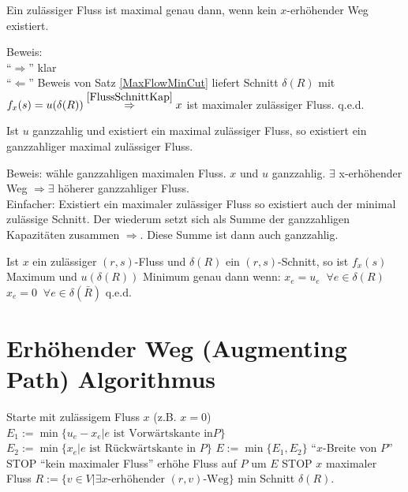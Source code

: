 \begin{satz}
Ein zulässiger Fluss ist maximal genau dann, wenn kein $x$-erhöhender Weg
existiert.
\end{satz}
Beweis: \\
"`$\Rightarrow$"' klar\\
"`$\Leftarrow$"' Beweis von Satz \ref{MaxFlowMinCut} liefert Schnitt
$\delta(R)$ mit $f_{x}(s) = u (\delta(R)) \stackrel{\ref{FlussSchnittKap}}{
\Rightarrow} x$ ist maximaler zulässiger Fluss. q.e.d.

\begin{satz}
Ist $u$ ganzzahlig und existiert ein maximal zulässiger Fluss, so existiert
ein ganzzahliger maximal zulässiger Fluss.
\end{satz}
Beweis: wähle ganzzahligen maximalen Fluss. $x$ und $u$ ganzzahlig.
$\exists$ x-erhöhender Weg $\Rightarrow \exists$ höherer ganzzahliger Fluss.\\
Einfacher: Existiert ein maximaler zulässiger Fluss so existiert auch der
minimal zulässige Schnitt. Der wiederum setzt sich als Summe der
ganzzahligen Kapazitäten zusammen $\Rightarrow$. Diese Summe ist dann auch 
ganzzahlig.

\begin{korollar}
Ist $x$ ein zulässiger $(r,s)$-Fluss und $\delta(R)$ ein
$(r,s)$-Schnitt, so ist $f_{x}(s)$ Maximum und $u(\delta(R))$ Minimum genau
dann wenn: 
$x_{e} = u_{e} \; \; \forall e \in \delta(R)$\\
$x_{e} = 0 \;\; \forall e \in \delta(\bar{R}) \mbox{ q.e.d.}$
\end{korollar}

\section{Erhöhender Weg (Augmenting Path) Algorithmus}

\begin{algorithmic}
\STATE Starte mit zulässigem Fluss $x$ (z.B. $x=0$)
\STATE $E_{1} := \min \{ u_{e} - x_{e} | e \mbox{ ist Vorwärtskante in
}P\}$
\STATE $E_{2} := \min \{x_{e} | e \mbox{ ist Rückwärtskante in } P \}$
\STATE $E := \min \{E_{1}, E_{2} \}$ \hspace{3mm} "`$x$-Breite von $P$"'
\STATE STOP \hspace{3mm} "`kein maximaler Fluss"'
\ELSE 
\STATE erhöhe Fluss auf $P$ um $E$
\ENDIF
\ENDWHILE
\STATE STOP $x$ maximaler Fluss
$R:= \{v \in V | \exists \mbox{$x$-erhöhender $(r,v)$-Weg} \}$ min Schnitt
$\delta(R)$.
\end{algorithmic}

